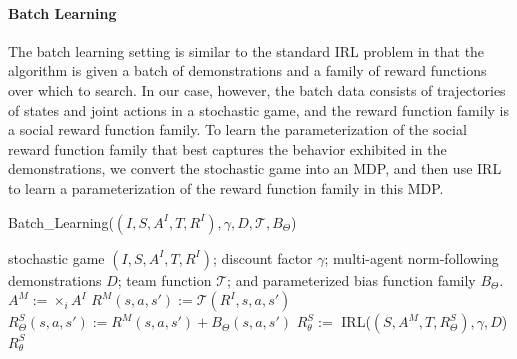 
\paragraph{Batch Learning}
\label{sec:batch}

The batch learning setting is similar to the standard IRL problem in
that the algorithm is given a batch of demonstrations and a family of
reward functions over which to search. In our case, however, the batch
data consists of trajectories of states and joint actions in a
stochastic game, and the reward function family is a social reward
function family.  To learn the parameterization of the social reward
function family that best captures the behavior exhibited in the
demonstrations, we convert the stochastic game into an MDP,
and then use IRL to learn a parameterization of the reward function
family in this MDP.

\begin{algorithm}[t]
\caption{Batch\_Learning($(I,S,A^I,T,R^I), \gamma, D, {\mathcal T}, B_\Theta$)}
\label{alg:srl}
\begin{algorithmic}
\Require stochastic game $(I,S,A^I,T,R^I)$; discount factor $\gamma$; multi-agent norm-following demonstrations $D$; team function ${\mathcal T}$; and parameterized bias function family $B_\Theta$.
\State $A^M := \times_i A^I$ 
\State $R^M(s, a, s') := {\mathcal T}(R^I, s, a, s')$ 
\State $R^S_\Theta(s, a, s') := R^M(s, a, s') + B_\Theta(s, a, s')$ 
\State $R^S_\theta :=$ IRL($(S,A^M,T,R^S_\Theta), \gamma, D$)
\State \Return $R^S_\theta$ 
\end{algorithmic}
\end{algorithm}

